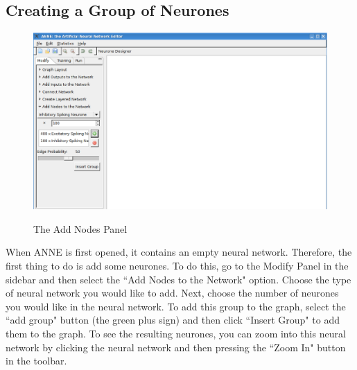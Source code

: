 \documentclass[11pt]{report}
\begin{document}
\subsection{Creating a Group of Neurones}
{
\begin{figure}[t]
\centering
\scalebox{0.4} {
	\includegraphics{addNodes}
}
\caption{The Add Nodes Panel}
\label{fig:addnodes}
\end{figure}
When ANNE is first opened, it contains an empty neural network. Therefore, the first thing to do is add some neurones. To do this, go to the Modify Panel in the sidebar and then select the ``Add Nodes to the Network" option. Choose the type of neural network you would like to add. Next, choose the number of neurones you would like in the neural network. To add this group to the graph, select the ``add group" button (the green plus sign) and then click ``Insert Group" to add them to the graph. To see the resulting neurones, you can zoom into this neural network by clicking the neural network and then pressing the ``Zoom In" button in the toolbar.
}
\newpage
\end{document}
